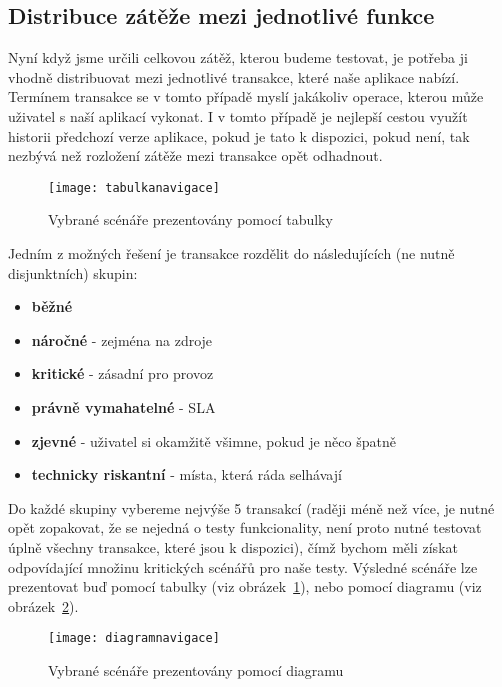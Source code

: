 \documentclass[122pt,oneside]{fithesis}
\begin{document}
\subsection{Distribuce zátěže mezi jednotlivé funkce}

Nyní když jsme určili celkovou zátěž, kterou budeme testovat, je potřeba ji vhodně distribuovat mezi jednotlivé transakce, které naše aplikace nabízí. Termínem transakce se v tomto případě myslí jakákoliv operace, kterou může uživatel s naší aplikací vykonat. I v tomto případě je nejlepší cestou využít historii předchozí verze aplikace, pokud je tato k dispozici, pokud není, tak nezbývá než rozložení zátěže mezi transakce opět odhadnout. 

\begin{figure}[!ht]
\centering
\texttt{[image: tabulkanavigace]}
\caption{Vybrané scénáře prezentovány pomocí tabulky~\cite{molyneaux09}}
\label{img:tabulkaNavigace}
\end{figure}

Jedním z možných řešení je transakce rozdělit do následujících (ne nutně disjunktních) skupin:
\begin{itemize}
  \item {\bf běžné}
  \item {\bf náročné} - zejména na zdroje
  \item {\bf kritické} - zásadní pro provoz
  \item {\bf právně vymahatelné} - SLA
  \item {\bf zjevné} - uživatel si okamžitě všimne, pokud je něco špatně
  \item {\bf technicky riskantní} - místa, která ráda selhávají
\end{itemize}

Do každé skupiny vybereme nejvýše 5 transakcí (raději méně než více, je nutné opět zopakovat, že se nejedná o testy funkcionality, není proto nutné testovat úplně všechny transakce, které jsou k dispozici), čímž bychom měli získat odpovídající množinu kritických scénářů pro naše testy. Výsledné scénáře lze prezentovat buď pomocí tabulky (viz obrázek~\ref{img:tabulkaNavigace}), nebo pomocí diagramu (viz obrázek~\ref{img:diagramNavigace}).

\begin{figure}[!ht]
\centering
\texttt{[image: diagramnavigace]}
\caption{Vybrané scénáře prezentovány pomocí diagramu}
\label{img:diagramNavigace}
\end{figure}
\end{document}
